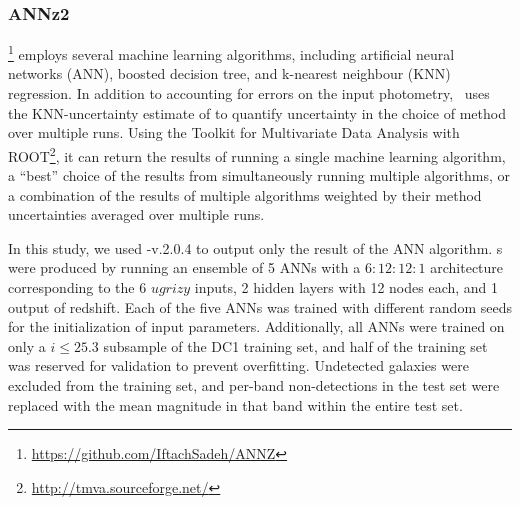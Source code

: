 
\subsubsection{ANNz2}
\label{sec:annz2}

\annz \footnote{\url{https://github.com/IftachSadeh/ANNZ}} \citep{Sadeh:16} employs several machine learning algorithms, including artificial neural networks (ANN), boosted decision tree, and k-nearest neighbour (KNN) regression.
In addition to accounting for errors on the input photometry, \annz\ uses the KNN-uncertainty estimate of \citet{Oyaizu:08} to quantify uncertainty in the choice of method over multiple runs.
Using the Toolkit for Multivariate Data Analysis with ROOT\footnote{\url{http://tmva.sourceforge.net/}}, it can return the results of running a single machine learning algorithm, a ``best'' choice of the results from simultaneously running multiple algorithms, or a combination of the results of multiple algorithms weighted by their method uncertainties averaged over multiple runs.

In this study, we used \annz-v.2.0.4 to output only the result of the ANN algorithm.
\Pzpdf s were produced by running an ensemble of 5 ANNs with a $6:12:12:1$ architecture corresponding to the 6 $ugrizy$ inputs, 2 hidden layers with 12 nodes each, and 1 output of redshift.
Each of the five ANNs was trained with different random seeds for the initialization of input parameters.
Additionally, all ANNs were trained on only a $i \leq 25.3$ subsample of the DC1 training set, and half of the training set was reserved for validation to prevent overfitting.
Undetected galaxies were excluded from the training set, and per-band non-detections in the test set were replaced with the mean magnitude in that band within the entire test set.

